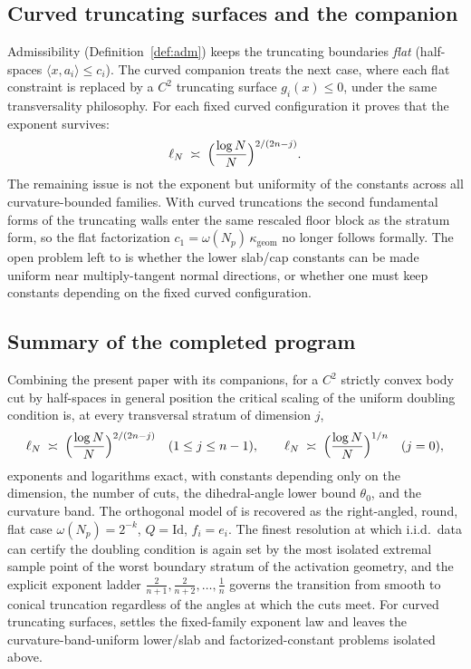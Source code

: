 \documentclass[11pt]{article}
\theoremstyle{definition}
\theoremstyle{remark}
\begin{document}
\subsection{Curved truncating surfaces and the companion}

Admissibility (Definition~\ref{def:adm}) keeps the truncating boundaries
\emph{flat} (half-spaces $\langle x,a_i\rangle\le c_i$).  The curved companion
\cite{companion15curved} treats the next case, where each flat constraint is
replaced by a \(C^2\) truncating surface \(g_i(x)\le0\), under the same
transversality philosophy.  For each fixed curved configuration it proves that
the exponent survives:
\[
\ell_N\;\asymp\;\Bigl(\frac{\log N}{N}\Bigr)^{2/(2n-j)}.
\]
The remaining issue is not the exponent but uniformity of the constants across
all curvature-bounded families.  With curved truncations the second fundamental
forms of the truncating walls enter the same rescaled floor block as the
stratum form, so the flat factorization
\(c_1=\omega(N_p)\,\kappa_{\mathrm{geom}}\) no longer follows formally.  The
open problem left to \cite{companion15curved} is whether the lower slab/cap
constants can be made uniform near multiply-tangent normal directions, or
whether one must keep constants depending on the fixed curved configuration.

\subsection{Summary of the completed program}

Combining the present paper with its companions, for a $C^2$ strictly convex
body cut by half-spaces in general position the critical scaling of the uniform
doubling condition is, at every transversal stratum of dimension $j$,
\[
\ell_N\;\asymp\;\Bigl(\frac{\log N}{N}\Bigr)^{2/(2n-j)}
\quad(1\le j\le n-1),
\qquad
\ell_N\;\asymp\;\Bigl(\frac{\log N}{N}\Bigr)^{1/n}
\quad(j=0),
\]
exponents and logarithms exact, with constants depending only on the dimension,
the number of cuts, the dihedral-angle lower bound $\theta_0$, and the
curvature band.  The orthogonal model of \cite{companion11} is recovered as the
right-angled, round, flat case $\omega(N_p)=2^{-k}$, $Q=\mathrm{Id}$,
$f_i=e_i$.  The finest resolution at which i.i.d.\ data can certify the
doubling condition is again set by the most isolated extremal sample point of
the worst boundary stratum of the activation geometry, and the explicit
exponent ladder $\tfrac2{n+1},\tfrac2{n+2},\dots,\tfrac1n$ governs the
transition from smooth to conical truncation regardless of the angles at which
the cuts meet.  For curved truncating surfaces, \cite{companion15curved}
settles the fixed-family exponent law and leaves the curvature-band-uniform
lower/slab and factorized-constant problems isolated above.
\end{document}
